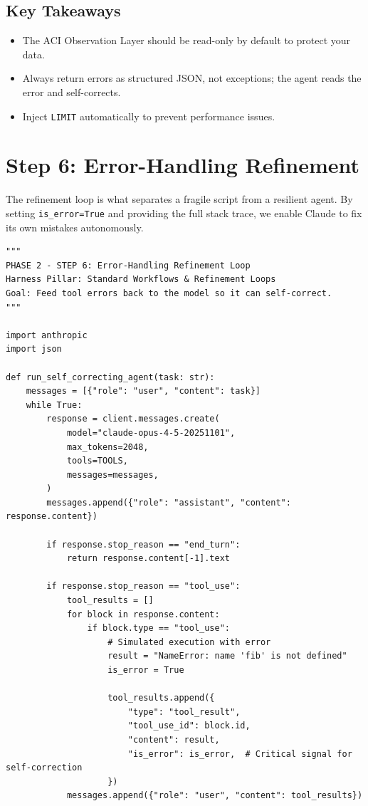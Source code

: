 \subsection*{Key Takeaways}
\begin{itemize}
    \item The ACI Observation Layer should be read-only by default to protect your data.
    \item Always return errors as structured JSON, not exceptions; the agent reads the error and self-corrects.
    \item Inject \texttt{LIMIT} automatically to prevent performance issues.
\end{itemize}

\section{Step 6: Error-Handling Refinement}
The refinement loop is what separates a fragile script from a resilient agent. By setting \texttt{is\_error=True} and providing the full stack trace, we enable Claude to fix its own mistakes autonomously.

\begin{lstlisting}[caption={step6\_error\_refinement.py}, label={lst:step6}]
"""
PHASE 2 - STEP 6: Error-Handling Refinement Loop
Harness Pillar: Standard Workflows & Refinement Loops
Goal: Feed tool errors back to the model so it can self-correct.
"""

import anthropic
import json

def run_self_correcting_agent(task: str):
    messages = [{"role": "user", "content": task}]
    while True:
        response = client.messages.create(
            model="claude-opus-4-5-20251101",
            max_tokens=2048,
            tools=TOOLS,
            messages=messages,
        )
        messages.append({"role": "assistant", "content": response.content})

        if response.stop_reason == "end_turn":
            return response.content[-1].text

        if response.stop_reason == "tool_use":
            tool_results = []
            for block in response.content:
                if block.type == "tool_use":
                    # Simulated execution with error
                    result = "NameError: name 'fib' is not defined"
                    is_error = True
                    
                    tool_results.append({
                        "type": "tool_result",
                        "tool_use_id": block.id,
                        "content": result,
                        "is_error": is_error,  # Critical signal for self-correction
                    })
            messages.append({"role": "user", "content": tool_results})
\end{lstlisting}

